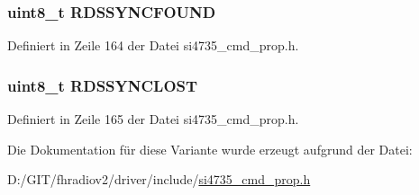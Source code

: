 \hypertarget{unionfm__rds__status__resp1_a924e0044d60c0d490d165ceb3ef6b23d}{}
\subsubsection[{R\+D\+S\+S\+Y\+N\+C\+F\+O\+U\+N\+D}]{\setlength{\rightskip}{0pt plus 5cm}uint8\+\_\+t R\+D\+S\+S\+Y\+N\+C\+F\+O\+U\+N\+D}\label{unionfm__rds__status__resp1_a924e0044d60c0d490d165ceb3ef6b23d}


Definiert in Zeile 164 der Datei si4735\+\_\+cmd\+\_\+prop.\+h.

\hypertarget{unionfm__rds__status__resp1_a73c3d34273c45dd08fcb341496c08052}{}
\subsubsection[{R\+D\+S\+S\+Y\+N\+C\+L\+O\+S\+T}]{\setlength{\rightskip}{0pt plus 5cm}uint8\+\_\+t R\+D\+S\+S\+Y\+N\+C\+L\+O\+S\+T}\label{unionfm__rds__status__resp1_a73c3d34273c45dd08fcb341496c08052}


Definiert in Zeile 165 der Datei si4735\+\_\+cmd\+\_\+prop.\+h.



Die Dokumentation für diese Variante wurde erzeugt aufgrund der Datei\+:\begin{DoxyCompactItemize}
\item 
D\+:/\+G\+I\+T/fhradiov2/driver/include/\hyperlink{si4735__cmd__prop_8h}{si4735\+\_\+cmd\+\_\+prop.\+h}\end{DoxyCompactItemize}
